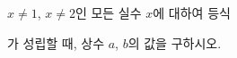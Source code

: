 $x\ne 1$, $x\ne 2$인 모든 실수 $x$에 대하여 등식\par\smallskip{}\par\smallskip\noindent 가 성립할 때, 상수 $a$, $b$의 값을 구하시오.
